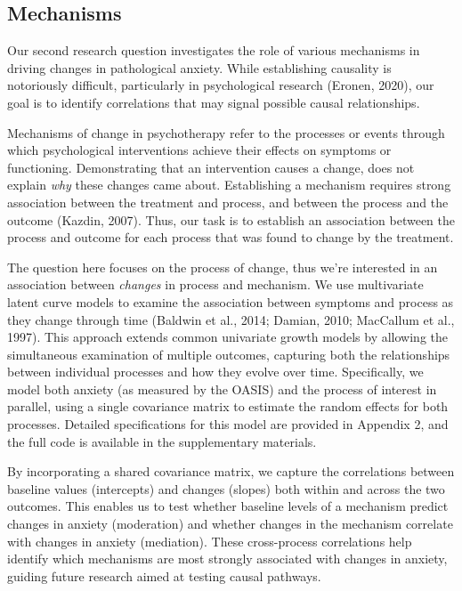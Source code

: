 \documentclass[
  man,floatsintext]{apa7}
\begin{document}
\subsection{Mechanisms}\label{mechanisms}

Our second research question investigates the role of various mechanisms in driving changes in pathological anxiety.
While establishing causality is notoriously difficult, particularly in psychological research (Eronen, 2020), our goal is to identify correlations that may signal possible causal relationships.

Mechanisms of change in psychotherapy refer to the processes or events through which psychological interventions achieve their effects on symptoms or functioning.
Demonstrating that an intervention causes a change, does not explain \emph{why} these changes came about.
Establishing a mechanism requires strong association between the treatment and process, and between the process and the outcome (Kazdin, 2007).
Thus, our task is to establish an association between the process and outcome for each process that was found to change by the treatment.

The question here focuses on the process of change, thus we're interested in an association between \emph{changes} in process and mechanism.
We use multivariate latent curve models to examine the association between symptoms and process as they change through time (Baldwin et al., 2014; Damian, 2010; MacCallum et al., 1997).
This approach extends common univariate growth models by allowing the simultaneous examination of multiple outcomes, capturing both the relationships between individual processes and how they evolve over time.
Specifically, we model both anxiety (as measured by the OASIS) and the process of interest in parallel, using a single covariance matrix to estimate the random effects for both processes.
Detailed specifications for this model are provided in Appendix 2, and the full code is available in the supplementary materials.

By incorporating a shared covariance matrix, we capture the correlations between baseline values (intercepts) and changes (slopes) both within and across the two outcomes.
This enables us to test whether baseline levels of a mechanism predict changes in anxiety (moderation) and whether changes in the mechanism correlate with changes in anxiety (mediation).
These cross-process correlations help identify which mechanisms are most strongly associated with changes in anxiety, guiding future research aimed at testing causal pathways.
\end{document}
